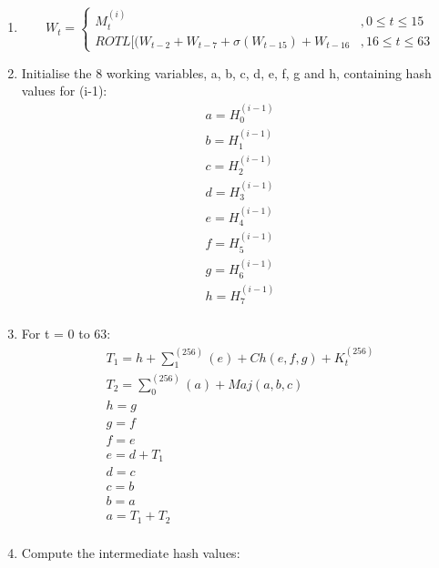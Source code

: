     \begin{enumerate}
        
        \item \[W_t=\begin{cases}
                        M^{(i)}_t &, 0 \leq t \leq 15\\
                        ROTL[(W_{t-2} + W_{t-7} + \sigma(W_{t-15}) + W_{t-16}  &, 16 \leq t \leq 63
                        \end{cases}\]
 
        
        \item Initialise the 8 working variables, a, b, c, d, e, f, g and h, containing hash values for (i-1): 
            \begin{gather*}     
                a = H^{(i-1)}_0 \\
                b = H^{(i-1)}_1 \\
                c = H^{(i-1)}_2 \\
                d = H^{(i-1)}_3 \\
                e = H^{(i-1)}_4 \\
                f = H^{(i-1)}_5 \\
                g = H^{(i-1)}_6 \\
                h = H^{(i-1)}_7 \\
            \end{gather*}
        \item For t = 0 to 63:
            \begin{align*}
                T_1 = h + \sum_{1}^{(256)}(e) + Ch(e,f,g) + K^{(256)}_t \\
                T_2 = \sum_{0}^{(256)}(a) + Maj(a,b,c) \\
                h = g \\
                g = f \\
                f = e \\
                e = d + T_1 \\
                d = c \\
                c = b \\ 
                b = a \\
                a = T_1 + T_2 \\
            \end{align*}
        
        \item Compute the intermediate hash values:
            

\end{enumerate}
